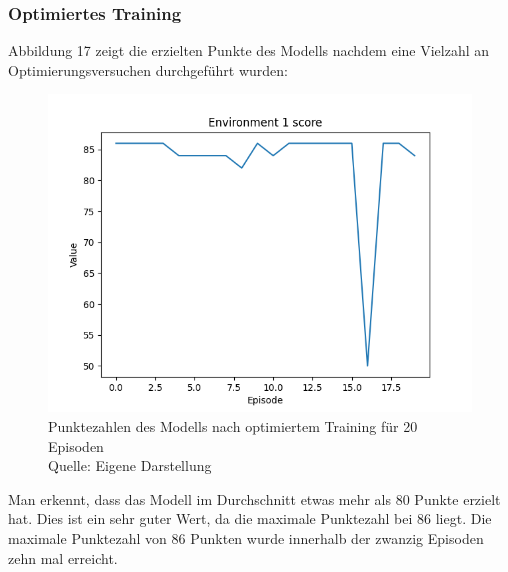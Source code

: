 \subsubsection{Optimiertes Training}
Abbildung 17 zeigt die erzielten Punkte des Modells nachdem eine Vielzahl an Optimierungsversuchen durchgeführt wurden:
\nopagebreak
\begin{figure}[H]
	\includegraphics[width=1\textwidth]{Bilder/optimizetraining} 
	\caption[Punktezahlen des Modells nach optimiertem Training für 20 Episoden]{Punktezahlen des Modells nach optimiertem Training für 20 Episoden\\ Quelle: Eigene Darstellung}
\end{figure}

Man erkennt, dass das Modell im Durchschnitt etwas mehr als 80 Punkte erzielt hat. Dies ist ein sehr guter Wert, da die maximale Punktezahl bei 86 liegt. Die maximale Punktezahl von 86 Punkten wurde innerhalb der zwanzig Episoden zehn mal erreicht.
